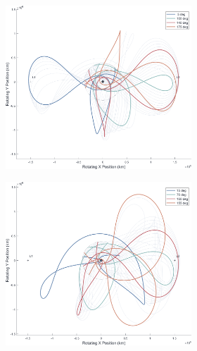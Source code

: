 \documentclass[letterpaper, paper,11pt]{AAS}	%
\begin{document}
\begin{figure}[h!]
    \begin{subfigure}{}
        \includegraphics[trim=75 50 0 0, clip, width=2.75in]{./figs/sunrot_ThetaPlot_io_famF_vInf0.9.png}
    \end{subfigure}
    \begin{subfigure}{}
        \includegraphics[trim=75 50 0 0, clip, width=2.75in]{./figs/sunrot_ThetaPlot_io_famF_vInf1.2.png}
    \end{subfigure}
\end{figure}
\end{document}
